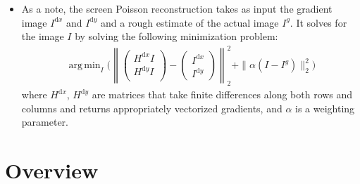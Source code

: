 \documentclass[10pt]{article}
\newcommand{\dee}{\mathrm{d}}
\DeclareMathOperator*{\argmin}{arg\,min}
\begin{document}
\begin{itemize}
  	\item As a note, the screen Poisson reconstruction takes as input the gradient image $I^{\dee x}$ and $I^{\dee y}$ and a rough estimate of the actual image $I^g$.  It solves for the image $I$ by solving the following minimization problem:
  	\begin{align*}
  		\argmin_I \bigg( \left\| \begin{pmatrix}
  			H^{\dee x} I \\ H^{\dee y} I \\ 
  		\end{pmatrix} - \begin{pmatrix}
  			I^{\dee x} \\
  			I^{\dee y}
  		\end{pmatrix} \right\|^2_2 
  		+ \| \alpha (I - I^g) \|^2_2 \bigg)
  	\end{align*}
  	where $H^{\dee x}$, $H^{\dee y}$ are matrices that take finite differences along both rows and columns and returns appropriately vectorized gradients, and $\alpha$ is a weighting parameter.
  \end{itemize}

  \section{Overview}
\end{document}
